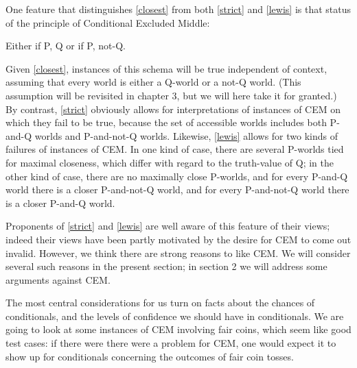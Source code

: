 \documentclass[leqno, 11pt, a5paper, openany]{article}
\begin{document}
One feature that distinguishes \ref{closest} from both \ref{strict} and \ref{lewis} is
that status of the principle of Conditional Excluded Middle:
\begin{prop}
	\litem[CEM] \label{CEM}
	Either if P, Q or if P, not-Q.
\end{prop}
Given \ref{closest}, instances of this schema will be true independent of context, assuming that every world is either a Q-world or a not-Q world. (This assumption will be revisited in chapter 3, but we will here take it for granted.) By contrast, \ref{strict} obviously allows for interpretations of instances of CEM on which they fail to be true, because the set of accessible worlds includes both P-and-Q worlds and P-and-not-Q worlds. Likewise, \ref{lewis} allows for two kinds of failures of instances of CEM. In one kind of case, there are several P-worlds tied for maximal closeness, which differ with regard to the truth-value of Q; in the other kind of case, there are no maximally close P-worlds, and for every P-and-Q world there is a closer P-and-not-Q world, and for every P-and-not-Q world there is a closer P-and-Q world.

Proponents of \ref{strict} and \ref{lewis} are well aware of this feature of their views; indeed their views have been partly motivated by the desire for CEM to come out invalid. However, we think there are strong reasons to like CEM. We will consider several such reasons in the present section; in section 2 we will address some arguments against CEM.

The most central considerations for us turn on facts about the chances of conditionals, and the levels of confidence we should have in conditionals. We are going to look at some instances of CEM involving fair coins, which seem like good test cases: if there were there were a problem for CEM, one would expect it to show up for conditionals concerning the outcomes of fair coin tosses.
\end{document}
